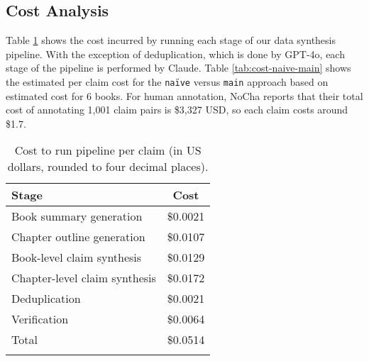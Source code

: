 \subsection{Cost Analysis}
\label{appendix:data-cost}
Table \ref{tab:cost_analysis} shows the cost incurred by running each stage of our data synthesis pipeline. With the exception of deduplication, which is done by GPT-4o, each stage of the pipeline is performed by Claude.  Table \ref{tab:cost-naive-main} shows the estimated per claim cost for the \texttt{na\"ive} versus \texttt{main} approach based on estimated cost for 6 books. For human annotation, NoCha \cite{karpinska_one_2024} reports that their total cost of annotating 1,001 claim pairs is \$3,327 USD, so each claim costs around \$1.7.

\begin{table}[htbp]
    \centering
    \small
    \begin{tabular}{lc}
        \toprule
        Stage & Cost\\
        \midrule 
        Book summary generation & \$0.0021 \\
        Chapter outline generation & \$0.0107 \\
        Book-level claim synthesis & \$0.0129 \\
        Chapter-level claim synthesis & \$0.0172 \\
        Deduplication & \$0.0021 \\
        Verification & \$0.0064 \\
        \midrule
        Total&\$0.0514\\
        \bottomrule\\
    \end{tabular}
    \caption{Cost to run pipeline per claim (in US dollars, rounded to four decimal places).}
    \label{tab:cost_analysis}
\end{table}


